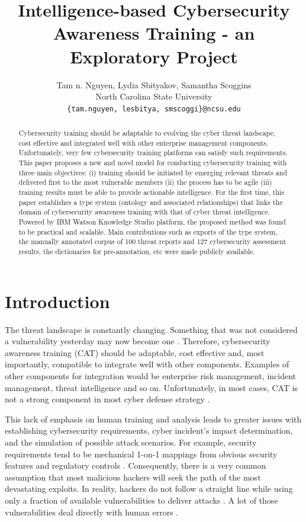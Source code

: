 \documentclass{article} %
\title{Intelligence-based Cybersecurity Awareness Training - an Exploratory Project}
\author{
Tam n. Nguyen, Lydia Sbityakov, Samantha Scoggins\\
North Carolina State University\\
\texttt{\{tam.nguyen, lesbitya, smscoggi\}@ncsu.edu} \\
}
\begin{document}
\maketitle

\begin{abstract}
  Cybersecurity training should be adaptable to evolving the cyber threat landscape, cost effective and integrated well with other enterprise management components. Unfortunately, very few cybersecurity training platforms can satisfy such requirements. This paper proposes a new and novel model for conducting cybersecurity training with three main objectives: (i) training should be initiated by emerging relevant threats and delivered first to the most vulnerable members (ii) the process has to be agile (iii) training results must be able to provide actionable intelligence. For the first time, this paper establishes a type system (ontology and associated relationships) that links the domain of cybersecurity awareness training with that of cyber threat intelligence. Powered by IBM Watson Knowledge Studio platform, the proposed method was found to be practical and scalable. Main contributions such as exports of the type system, the manually annotated corpus of 100 threat reports and 127 cybersecurity assessment results, the dictionaries for pre-annotation, etc were made publicly available.
\end{abstract}

\section{Introduction}
The threat landscape is constantly changing. Something that was not considered a vulnerability yesterday may now become one \cite{Manadhata2011AnMetric}. Therefore, cybersecurity awareness training (CAT) should be adaptable, cost effective and, most importantly, compatible to integrate well with other components. Examples of other components for integration would be enterprise risk management, incident management, threat intelligence and so on. Unfortunately, in most cases, CAT is not a strong component in most cyber defense strategy \cite{Jakoubi2009AManagement}.

This lack of emphasis on human training and analysis leads to greater issues with establishing cybersecurity requirements, cyber incident's impact determination, and the simulation of possible attack scenarios. For example, security requirements tend to be mechanical 1-on-1 mappings from obvious security features and regulatory controls \cite{Cleland-Huang2014HowGratae}. Consequently, there is a very common assumption that most malicious hackers will seek the path of the most devastating exploits. In reality, hackers do not follow a straight line while using only a fraction of available vulnerabilities to deliver attacks \cite{Allodi2017TowardsAssumptions}. A lot of those vulnerabilities deal directly with human errors \cite{Messaoud2017AdvancedChallenges}.
\end{document}
